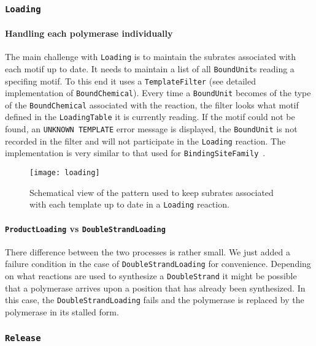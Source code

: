 \subsubsection{\texttt{Loading}}

\paragraph{Handling each polymerase individually} The main challenge with \texttt{Loading} is to maintain the subrates associated with each motif up to date. It needs to maintain a list of all \texttt{BoundUnit}s reading a specifing motif. To this end it uses a \texttt{TemplateFilter} (see detailed implementation of \texttt{BoundChemical}). Every time a \texttt{BoundUnit} becomes of the type of the \texttt{BoundChemical} associated with the reaction, the filter looks what motif defined in the \texttt{LoadingTable} it is currently reading. If the motif could not be found, an \texttt{UNKNOWN TEMPLATE} error message is displayed, the \texttt{BoundUnit} is not recorded in the filter and will not participate in the \texttt{Loading} reaction. The implementation is very similar to that used for \texttt{BindingSiteFamily}~.

\begin{figure}[!h]
  \centering
  \texttt{[image: loading]}
  \caption{Schematical view of the pattern used to keep subrates associated with each template up to date in a \texttt{Loading} reaction.}
  \label{fig:loading}
\end{figure}

\paragraph{\texttt{ProductLoading} vs \texttt{DoubleStrandLoading}} There difference between the two processes is rather small. We just added a failure condition in the case of \texttt{DoubleStrandLoading} for convenience. Depending on what reactions are used to synthesize a \texttt{DoubleStrand} it might be possible that a polymerase arrives upon a position that has already been synthesized. In this case, the \texttt{DoubleStrandLoading} fails and the polymerase is replaced by the polymerase in its stalled form.

\subsubsection{\texttt{Release}}

